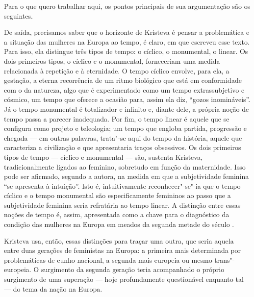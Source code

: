 Para o que quero trabalhar aqui, os pontos principais de sua
argumentação são os seguintes.

De saída, precisamos saber que o horizonte de Kristeva é pensar a
problemática e a situação das mulheres na Europa ao tempo, é claro, em
que escreveu esse texto. Para isso, ela distingue três tipos de tempo: o
cíclico, o monumental, o linear. Os dois primeiros tipos, o cíclico e o
monumental, forneceriam uma medida relacionada à repetição e à
eternidade. O tempo cíclico envolve, para ela, a gestação, a eterna
recorrência de um ritmo biológico que está em conformidade com o da
natureza, algo que é experimentado como um tempo extrassubjetivo e
cósmico, um tempo que oferece a ocasião para, assim ela diz, ``gozos
inomináveis''. Já o tempo monumental é totalizador e infinito e, diante
dele, a própria noção de tempo passa a parecer inadequada. Por fim, o
tempo linear é aquele que se configura como projeto e teleologia; um
tempo que engloba partida, progressão e chegada --- em outras palavras,
trata"-se aqui do tempo da história, aquele que caracteriza a civilização
e que apresentaria traços obsessivos. Os dois primeiros tipos de tempo
--- cíclico e monumental --- são, sustenta Kristeva, tradicionalmente
ligados ao feminino, sobretudo em função da maternidade. Isso pode ser
afirmado, segundo a autora, na medida em que a subjetividade feminina
``se apresenta à intuição''. Isto é, intuitivamente reconhecer"-se"-ia que
o tempo cíclico e o tempo monumental são especificamente femininos ao
passo que a subjetividade feminina seria refratária ao tempo linear. A
distinção entre essas noções de tempo é, assim, apresentada como a chave
para o diagnóstico da condição das mulheres na Europa em meados da
segunda metade do século .

Kristeva usa, então, essas distinções para traçar uma outra, que seria
aquela entre duas gerações de feministas na Europa: a primeira mais
determinada por problemáticas de cunho nacional, a segunda mais europeia
ou mesmo trans"-europeia. O surgimento da segunda geração teria
acompanhado o próprio surgimento de uma superação --- hoje profundamente
questionável enquanto tal --- do tema da nação na Europa.

